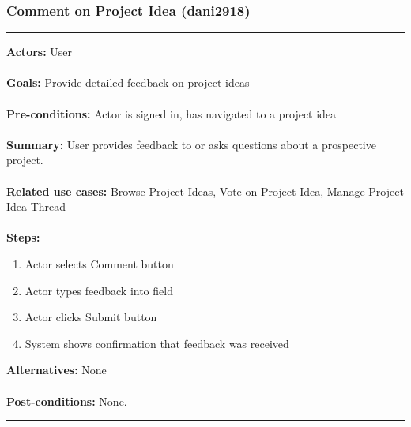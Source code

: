 \documentclass[11pt]{report}
\begin{document}
\subsubsection{Comment on Project Idea (dani2918)}
\vspace{2pt}
\hrule
\vspace{8pt}
 \textbf{Actors:} User \\ \\
\textbf{Goals:} Provide detailed feedback on project ideas  \\ \\
 \textbf{Pre-conditions:} Actor is signed in, has navigated to a project idea  \\ \\
 \textbf{Summary:}  User provides feedback to or asks questions about a prospective project. \\ \\
\textbf{Related use cases:} Browse Project Ideas, Vote on Project Idea, Manage Project Idea Thread \\ \\
\textbf{Steps:} \begin{enumerate}
  \item Actor selects Comment button
  \item Actor types feedback into field 
  \item Actor clicks Submit button
  \item System shows confirmation that feedback was received 
 \end{enumerate}
 \textbf{Alternatives:} None \\ \\
 \textbf{Post-conditions:} None. \\
\vspace{8pt}
\hrule
\newpage
\end{document}
